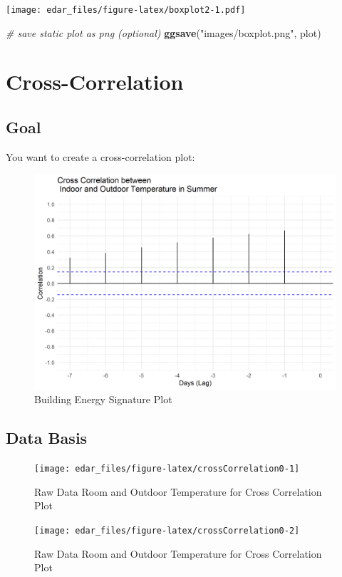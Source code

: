 \documentclass[
  a4paperpaper,
]{book}
\newenvironment{Shaded}{\begin{snugshade}}{\end{snugshade}}
\newcommand{\CommentTok}[1]{\textcolor[rgb]{0.56,0.35,0.01}{\textit{#1}}}
\newcommand{\KeywordTok}[1]{\textcolor[rgb]{0.13,0.29,0.53}{\textbf{#1}}}
\newcommand{\NormalTok}[1]{#1}
\newcommand{\StringTok}[1]{\textcolor[rgb]{0.31,0.60,0.02}{#1}}
\let\oldShaded\Shaded
\let\endoldShaded\endShaded
\renewenvironment{Shaded}{\footnotesize\oldShaded}{\endoldShaded}
\begin{document}
\texttt{[image: edar\_files/figure-latex/boxplot2-1.pdf]}

\begin{Shaded}
\begin{Highlighting}[]
\CommentTok{# save static plot as png (optional)}
\KeywordTok{ggsave}\NormalTok{(}\StringTok{"images/boxplot.png"}\NormalTok{, plot)}
\end{Highlighting}
\end{Shaded}

\newpage

\hypertarget{cross-correlation}{%
\section{Cross-Correlation}\label{cross-correlation}}

\hypertarget{goal-15}{%
\subsection{Goal}\label{goal-15}}

You want to create a cross-correlation plot:

\begin{figure}
\includegraphics[width=0.7\linewidth]{images/crossCorrelation} \caption{Building Energy Signature Plot}\label{fig:unnamed-chunk-25}
\end{figure}

\hypertarget{data-basis-15}{%
\subsection{Data Basis}\label{data-basis-15}}

\begin{figure}
\texttt{[image: edar\_files/figure-latex/crossCorrelation0-1]} \caption{Raw Data Room and Outdoor Temperature for Cross Correlation Plot}\label{fig:crossCorrelation0-1}
\end{figure}
\begin{figure}
\texttt{[image: edar\_files/figure-latex/crossCorrelation0-2]} \caption{Raw Data Room and Outdoor Temperature for Cross Correlation Plot}\label{fig:crossCorrelation0-2}
\end{figure}
\end{document}
